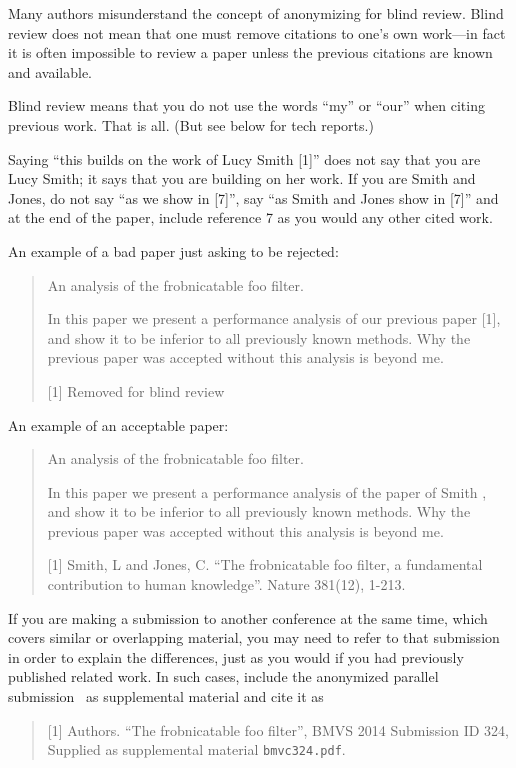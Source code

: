 \documentclass[runningheads]{llncs}
\begin{document}
Many authors misunderstand the concept of anonymizing for blind review.
Blind review does not mean that one must remove citations to one's own work---in fact it is often impossible to review a paper unless the previous citations are known and available.

Blind review means that you do not use the words ``my'' or ``our'' when citing previous work.
That is all.
(But see below for tech reports.)

Saying ``this builds on the work of Lucy Smith [1]'' does not say that you are Lucy Smith;
it says that you are building on her work.
If you are Smith and Jones, do not say ``as we show in [7]'', say ``as Smith and Jones show in [7]'' and at the end of the paper, include reference 7 as you would any other cited work.

An example of a bad paper just asking to be rejected:
\begin{quote}
  \begin{center}
      An analysis of the frobnicatable foo filter.
  \end{center}

   In this paper we present a performance analysis of our previous paper [1], and show it to be inferior to all previously known methods.
   Why the previous paper was accepted without this analysis is beyond me.

   [1] Removed for blind review
\end{quote}

An example of an acceptable paper:
\begin{quote}
  \begin{center}
     An analysis of the frobnicatable foo filter.
  \end{center}

   In this paper we present a performance analysis of the  paper of Smith \etal [1], and show it to be inferior to all previously known methods.
   Why the previous paper was accepted without this analysis is beyond me.

   [1] Smith, L and Jones, C. ``The frobnicatable foo filter, a fundamental contribution to human knowledge''. Nature 381(12), 1-213.
\end{quote}

If you are making a submission to another conference at the same time, which covers similar or overlapping material, you may need to refer to that submission in order to explain the differences, just as you would if you had previously published related work.
In such cases, include the anonymized parallel submission~\cite{Authors14} as supplemental material and cite it as
\begin{quote}
  [1] Authors. ``The frobnicatable foo filter'', BMVS 2014 Submission ID 324, Supplied as supplemental material {\tt bmvc324.pdf}.
\end{quote}
\end{document}
